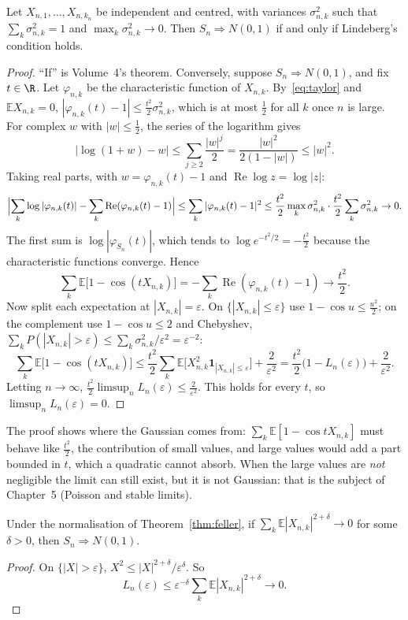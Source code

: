 \begin{theorem}\label{thm:feller}
Let $X_{n,1},\dots,X_{n,k_n}$ be independent and centred, with variances $\sigma_{n,k}^2$ such that $\sum_k\sigma_{n,k}^2=1$ and $\max_k\sigma_{n,k}^2\to0$.
Then $S_n\Rightarrow N(0,1)$ if and only if Lindeberg's condition holds.
\end{theorem}
\begin{proof}
``If'' is Volume~4's theorem. Conversely, suppose $S_n\Rightarrow N(0,1)$, and fix $t\in\R$. Let $\varphi_{n,k}$ be the characteristic function of
$X_{n,k}$. By~\eqref{eq:taylor} and $\mathbb EX_{n,k}=0$, $|\varphi_{n,k}(t)-1|\le\frac{t^2}2\sigma_{n,k}^2$, which is at most $\frac12$ for all $k$ once $n$ is
large. For complex $w$ with $|w|\le\frac12$, the series of the logarithm gives
\[
|\log(1+w)-w|\le\sum_{j\ge2}\frac{|w|^j}2=\frac{|w|^2}{2(1-|w|)}\le|w|^2.
\]
Taking real parts, with $w=\varphi_{n,k}(t)-1$ and $\operatorname{Re}\log z=\log|z|$:
\[
\Bigl|\sum_k\log|\varphi_{n,k}(t)|-\sum_k\operatorname{Re}(\varphi_{n,k}(t)-1)\Bigr|\le\sum_k|\varphi_{n,k}(t)-1|^2\le\frac{t^2}2\max_k\sigma_{n,k}^2\cdot\frac{t^2}2\sum_k\sigma_{n,k}^2\to0.
\]
The first sum is $\log|\varphi_{S_n}(t)|$, which tends to $\log e^{-t^2/2}=-\frac{t^2}2$ because the characteristic functions converge. Hence
\[
\sum_k\mathbb E\bigl[1-\cos(tX_{n,k})\bigr]=-\sum_k\operatorname{Re}(\varphi_{n,k}(t)-1)\to\frac{t^2}2.
\]
Now split each expectation at $|X_{n,k}|=\varepsilon$. On $\{|X_{n,k}|\le\varepsilon\}$ use $1-\cos u\le\frac{u^2}2$; on the complement use $1-\cos u\le2$ and
Chebyshev, $\sum_kP(|X_{n,k}|>\varepsilon)\le\sum_k\sigma_{n,k}^2/\varepsilon^2=\varepsilon^{-2}$:
\[
\sum_k\mathbb E\bigl[1-\cos(tX_{n,k})\bigr]\le\frac{t^2}2\sum_k\mathbb E\bigl[X_{n,k}^2\mathbf 1_{|X_{n,k}|\le\varepsilon}\bigr]+\frac2{\varepsilon^2}
=\frac{t^2}2\bigl(1-L_n(\varepsilon)\bigr)+\frac2{\varepsilon^2}.
\]
Letting $n\to\infty$, $\frac{t^2}2\limsup_nL_n(\varepsilon)\le\frac2{\varepsilon^2}$. This holds for every $t$, so $\limsup_nL_n(\varepsilon)=0$.
\end{proof}

The proof shows where the Gaussian comes from: $\sum_k\mathbb E[1-\cos tX_{n,k}]$ must behave like $\frac{t^2}2$, the contribution of small values,
and large values would add a part bounded in $t$, which a quadratic cannot absorb. When the large values are \emph{not} negligible the limit can
still exist, but it is not Gaussian: that is the subject of Chapter~5 (Poisson and stable limits).

\begin{corollary}\label{cor:lyapunov}
Under the normalisation of Theorem~\ref{thm:feller}, if $\sum_k\mathbb E|X_{n,k}|^{2+\delta}\to0$ for some $\delta>0$, then $S_n\Rightarrow N(0,1)$.
\end{corollary}
\begin{proof}
On $\{|X|>\varepsilon\}$, $X^2\le|X|^{2+\delta}/\varepsilon^\delta$. So
\[
L_n(\varepsilon)\le\varepsilon^{-\delta}\sum_k\mathbb E|X_{n,k}|^{2+\delta}\to0.
\]
\end{proof}

